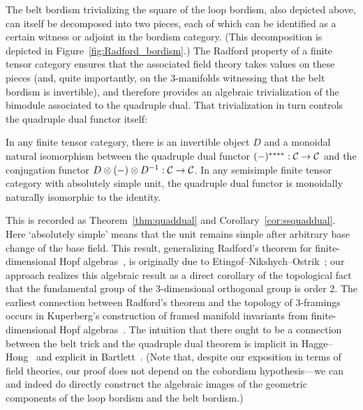 \documentclass{amsart}
\begin{document}
The belt bordism trivializing the square of the loop bordism, also depicted above, can itself be decomposed into two pieces, each of which can be identified as a certain witness or adjoint in the bordism category.  (This decomposition is depicted in Figure~\ref{fig:Radford_bordism}.)  The Radford property of a finite tensor category ensures that the associated field theory takes values on these pieces (and, quite importantly, on the 3-manifolds witnessing that the belt bordism is invertible), and therefore provides an algebraic trivialization of the bimodule associated to the quadruple dual.  That trivialization in turn controls the quadruple dual functor itself:
\begin{maincor} \label{cor7}
In any finite tensor category, there is an invertible object $D$ and a monoidal natural isomorphism between the quadruple dual functor $(-)^{****}: \mathcal C \rightarrow \mathcal C$ and the conjugation functor $D \otimes (-) \otimes D^{-1}: \mathcal C \rightarrow \mathcal C$.  In any semisimple finite tensor category with absolutely simple unit, the quadruple dual functor is monoidally naturally isomorphic to the identity.
\end{maincor}
\nid This is recorded as Theorem~\ref{thm:quaddual} and Corollary~\ref{cor:ssquaddual}.  Here `absolutely simple' means that the unit remains simple after arbitrary base change of the base field.  This result, generalizing Radford's theorem for finite-dimensional Hopf algebras~\cite{MR0407069}, is originally due to Etingof--Nikshych--Ostrik~\cite{MR2097289, MR2183279}; our approach realizes this algebraic result as a direct corollary of the topological fact that the fundamental group of the 3-dimensional orthogonal group is order 2.  The earliest connection between Radford's theorem and the topology of 3-framings occurs in Kuperberg's construction of framed manifold invariants from finite-dimensional Hopf algebras~\cite{MR1394749}.  The intuition that there ought to be a connection between the belt trick and the quadruple dual theorem is implicit in Hagge--Hong~\cite{MR2559711} and explicit in Bartlett~\cite{0901.3975}.  (Note that, despite our exposition in terms of field theories, our proof does not depend on the cobordism hypothesis---we can and indeed do directly construct the algebraic images of the geometric components of the loop bordism and the belt bordism.)
\end{document}
